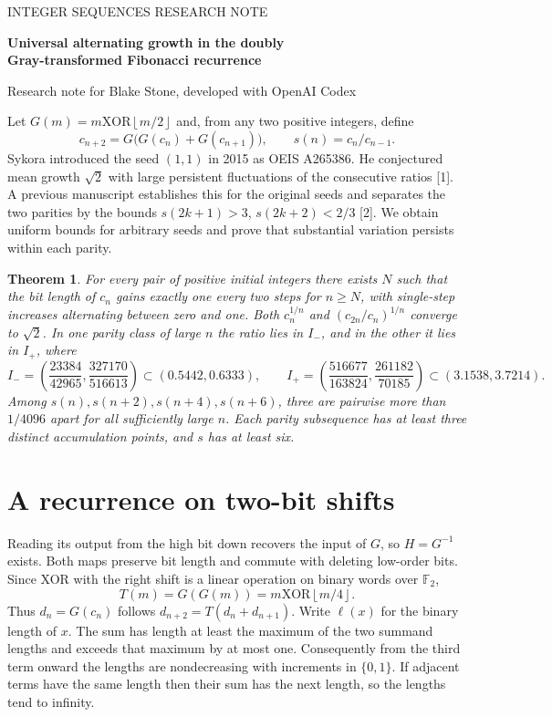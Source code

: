 \documentclass[11pt,letterpaper]{article}
\newtheorem{theorem}{Theorem}
\newcommand{\fl}[1]{\left\lfloor#1\right\rfloor}
\begin{document}
{\small\sffamily\color{ink} INTEGER SEQUENCES \hfill RESEARCH NOTE}\par
{\LARGE\bfseries Universal alternating growth in the doubly\\[2pt] Gray-transformed Fibonacci recurrence}\par
{\small Research note for Blake Stone, developed with OpenAI Codex}\par
\medskip
Let $G(m)=m\mathbin{\mathrm{XOR}}\fl{m/2}$ and, from any two positive integers, define
\[
 c_{n+2}=G\bigl(G(c_n)+G(c_{n+1})\bigr),\qquad s(n)=c_n/c_{n-1}.
\]
Sykora introduced the seed $(1,1)$ in 2015 as OEIS A265386. He conjectured mean growth $\sqrt2$ with large persistent fluctuations of the consecutive ratios [1]. A previous manuscript establishes this for the original seeds and separates the two parities by the bounds $s(2k+1)>3$, $s(2k+2)<2/3$ [2]. We obtain uniform bounds for arbitrary seeds and prove that substantial variation persists within each parity.

\begin{theorem}
For every pair of positive initial integers there exists $N$ such that the bit length of $c_n$ gains exactly one every two steps for $n\ge N$, with single-step increases alternating between zero and one. Both $c_n^{1/n}$ and $(c_{2n}/c_n)^{1/n}$ converge to $\sqrt2$. In one parity class of large $n$ the ratio lies in $I_-$, and in the other it lies in $I_+$, where
\[
 I_- = \left(\frac{23384}{42965},\frac{327170}{516613}\right)
 \subset (0.5442,0.6333),\qquad
 I_+ = \left(\frac{516677}{163824},\frac{261182}{70185}\right)
 \subset (3.1538,3.7214).
\]
Among $s(n),s(n+2),s(n+4),s(n+6)$, three are pairwise more than $1/4096$ apart for all sufficiently large $n$. Each parity subsequence has at least three distinct accumulation points, and $s$ has at least six.
\end{theorem}

\section*{A recurrence on two-bit shifts}
Reading its output from the high bit down recovers the input of $G$, so $H=G^{-1}$ exists. Both maps preserve bit length and commute with deleting low-order bits. Since XOR with the right shift is a linear operation on binary words over $\mathbb F_2$,
\[
  T(m)=G(G(m))=m\mathbin{\mathrm{XOR}}\fl{m/4}.
\]
Thus $d_n=G(c_n)$ follows $d_{n+2}=T(d_n+d_{n+1})$. Write $\ell(x)$ for the binary length of $x$. The sum has length at least the maximum of the two summand lengths and exceeds that maximum by at most one. Consequently from the third term onward the lengths are nondecreasing with increments in $\{0,1\}$. If adjacent terms have the same length then their sum has the next length, so the lengths tend to infinity.
\end{document}
